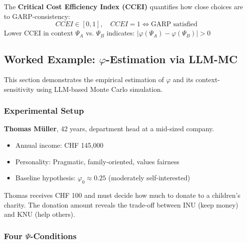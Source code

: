 \begin{definition}
\label{def:ccei}
The \textbf{Critical Cost Efficiency Index (CCEI)} quantifies how close choices are to GARP-consistency:
\begin{equation}
CCEI \in [0,1], \quad CCEI = 1 \Leftrightarrow \text{GARP satisfied}
\end{equation}
Lower CCEI in context $\Psi_A$ vs. $\Psi_B$ indicates: $|\varphi(\Psi_A) - \varphi(\Psi_B)| > 0$
\end{definition}



\subsection{Worked Example: $\varphi$-Estimation via LLM-MC}
\label{sec:phi-example}

This section demonstrates the empirical estimation of $\varphi$ and its context-sensitivity using LLM-based Monte Carlo simulation.

\subsubsection{Experimental Setup}

\begin{definition}[Persona]
\label{def:example-persona}
\textbf{Thomas Müller}, 42 years, department head at a mid-sized company.
\begin{itemize}
\item Annual income: CHF 145,000
\item Personality: Pragmatic, family-oriented, values fairness
\item Baseline hypothesis: $\varphi_0 \approx 0.25$ (moderately self-interested)
\end{itemize}
\end{definition}

\begin{definition}
\label{def:example-task}
Thomas receives CHF 100 and must decide how much to donate to a children's charity. The donation amount reveals the trade-off between INU (keep money) and KNU (help others).
\end{definition}

\subsubsection{Four $\Psi$-Conditions}

